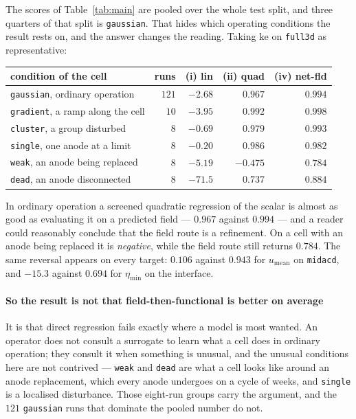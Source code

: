 \documentclass[11pt,a4paper]{article}
\theoremstyle{plain}
\theoremstyle{definition}
\theoremstyle{remark}
\begin{document}
The scores of Table~\ref{tab:main} are pooled over the whole test split, and three
quarters of that split is \texttt{gaussian}. That hides which operating conditions
the result rests on, and the answer changes the reading. Taking $\mathrm{ke}$ on
\texttt{full3d} as representative:

\begin{center}
\small
\begin{tabular}{@{}lrrrr@{}}
\toprule
condition of the cell & runs & (i) lin & (ii) quad & (iv) net-fld \\
\midrule
\texttt{gaussian}, ordinary operation   & $121$ & $-2.68$  & $0.967$  & $0.994$ \\
\texttt{gradient}, a ramp along the cell & $10$ & $-3.95$  & $0.992$  & $0.998$ \\
\texttt{cluster}, a group disturbed      & $8$  & $-0.69$  & $0.979$  & $0.993$ \\
\texttt{single}, one anode at a limit    & $8$  & $-0.20$  & $0.986$  & $0.982$ \\
\texttt{weak}, an anode being replaced   & $8$  & $-5.19$  & $\mathbf{-0.475}$ & $\mathbf{0.784}$ \\
\texttt{dead}, an anode disconnected     & $8$  & $-71.5$  & $0.737$  & $0.884$ \\
\bottomrule
\end{tabular}
\end{center}

\noindent
In ordinary operation a screened quadratic regression of the scalar is almost as
good as evaluating it on a predicted field --- $0.967$ against $0.994$ --- and a
reader could reasonably conclude that the field route is a refinement. On a cell
with an anode being replaced it is \emph{negative}, while the field route still
returns $0.784$. The same reversal appears on every target: $0.106$ against
$0.943$ for $u_{\mathrm{mean}}$ on \texttt{midacd}, and $-15.3$ against $0.694$
for $\eta_{\min}$ on the interface.

\paragraph{So the result is not that field-then-functional is better on average}
It is that direct regression fails exactly where a model is most wanted. An
operator does not consult a surrogate to learn what a cell does in ordinary
operation; they consult it when something is unusual, and the unusual conditions
here are not contrived --- \texttt{weak} and \texttt{dead} are what a cell looks
like around an anode replacement, which every anode undergoes on a cycle of
weeks, and \texttt{single} is a localised disturbance. Those eight-run groups
carry the argument, and the $121$ \texttt{gaussian} runs that dominate the pooled
number do not.
\end{document}

